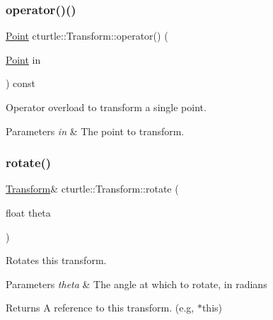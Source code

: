 \subsubsection{\texorpdfstring{operator()()}{operator()()}}
{\footnotesize\ttfamily \hyperlink{structcturtle_1_1ivec2}{Point} cturtle\+::\+Transform\+::operator() (\begin{DoxyParamCaption}\item[{\hyperlink{structcturtle_1_1ivec2}{Point}}]{in }\end{DoxyParamCaption}) const\hspace{0.3cm}{\ttfamily [inline]}}



Operator overload to transform a single point. 


\begin{DoxyParams}{Parameters}
{\em in} & The point to transform. \\
\hline
\end{DoxyParams}
\mbox{\label{classcturtle_1_1Transform_a0f94d37257362afb874f5df8a127613a}} 
\subsubsection{\texorpdfstring{rotate()}{rotate()}}
{\footnotesize\ttfamily \hyperlink{classcturtle_1_1Transform}{Transform}\& cturtle\+::\+Transform\+::rotate (\begin{DoxyParamCaption}\item[{float}]{theta }\end{DoxyParamCaption})\hspace{0.3cm}{\ttfamily [inline]}}



Rotates this transform. 


\begin{DoxyParams}{Parameters}
{\em theta} & The angle at which to rotate, in radians \\
\hline
\end{DoxyParams}
\begin{DoxyReturn}{Returns}
A reference to this transform. (e.\+g, $\ast$this) 
\end{DoxyReturn}
\mbox{\label{classcturtle_1_1Transform_a985c6b26564267172e0f3d8ced7868e0}} 
